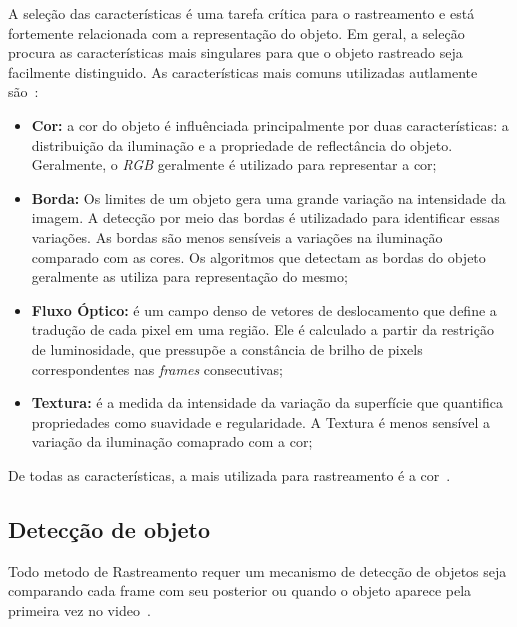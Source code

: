 	A seleção das características é uma tarefa crítica para o rastreamento e está fortemente relacionada com a representação do objeto. Em geral, a seleção procura as características mais singulares para que o objeto rastreado seja facilmente distinguido. As características mais comuns utilizadas autlamente são~\cite{yilmaz}:

	\begin{itemize}
		\item \textbf{Cor:} a cor do objeto é influênciada principalmente por duas características: a distribuição da iluminação e a propriedade de reflectância do objeto. Geralmente, o \textit{RGB} geralmente é utilizado para representar a cor;

		\item \textbf{Borda:} Os limites de um objeto gera uma grande variação na intensidade da imagem. A detecção por meio das bordas é utilizadado para identificar essas variações. As bordas são menos sensíveis a variações na iluminação comparado com as cores. Os algoritmos que detectam as bordas do objeto geralmente as utiliza para representação do mesmo;

		\item \textbf{Fluxo Óptico:} é um campo denso de vetores de deslocamento que define a tradução de cada pixel em uma região. Ele é calculado a partir da restrição de luminosidade, que pressupõe a constância de brilho de pixels correspondentes nas \textit{frames} consecutivas;

		\item \textbf{Textura:} é a medida da intensidade da variação da superfície que quantifica propriedades como suavidade e regularidade. A Textura é menos sensível a variação da iluminação comaprado com a cor;

	\end{itemize}

De todas as características, a mais utilizada para rastreamento é a cor~\cite{yilmaz}.

\subsection{Detecção de objeto}

	Todo metodo de Rastreamento requer um mecanismo de detecção de objetos seja comparando cada frame com seu posterior ou quando o objeto aparece pela primeira vez no video~\cite{yilmaz}.

